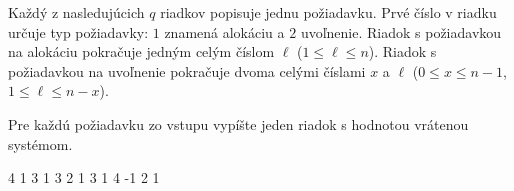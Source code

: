 Každý z nasledujúcich $q$ riadkov popisuje jednu požiadavku. Prvé číslo v riadku
určuje typ požiadavky: $1$ znamená alokáciu a $2$ uvoľnenie. Riadok s
požiadavkou na alokáciu pokračuje jedným celým číslom $\ell$ ($1 \leq \ell \leq
n$). Riadok s požiadavkou na uvoľnenie pokračuje dvoma celými číslami $x$ a
$\ell$ ($0 \leq x \leq n-1$, $1 \leq \ell \leq n-x$).



Pre každú požiadavku zo vstupu vypíšte jeden riadok s hodnotou vrátenou
systémom.



 4
1 3
1 3
2 1 3
1 4
-1
2
1
\sampleEND



